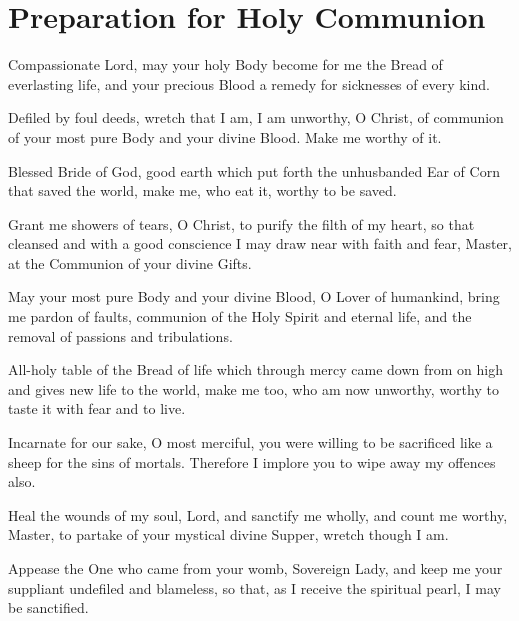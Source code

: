 \newpage
\section{Preparation for Holy Communion}




Compassionate Lord, may your holy Body become for me the Bread of everlasting life, and your precious Blood a remedy for sicknesses of every kind.

Defiled by foul deeds, wretch that I am, I am unworthy, O Christ, of communion of your most pure Body and your divine Blood. Make me worthy of it.

\theotokion

Blessed Bride of God, good earth which put forth the unhusbanded Ear of Corn that saved the world, make me, who eat it, worthy to be saved.


Grant me showers of tears, O Christ, to purify the filth of my heart, so that cleansed and with a good conscience I may draw near with faith and fear, Master, at the Communion of your divine Gifts.

May your most pure Body and your divine Blood, O Lover of humankind, bring me pardon of faults, communion of the Holy Spirit and eternal life, and the removal of passions and tribulations.

\theotokion

All-holy table of the Bread of life which through mercy came down from on high and gives new life to the world, make me too, who am now unworthy, worthy to taste it with fear and to live.


Incarnate for our sake, O most merciful, you were willing to be sacrificed like a sheep for the sins of mortals. Therefore I implore you to wipe away my offences also.

Heal the wounds of my soul, Lord, and sanctify me wholly, and count me worthy, Master, to partake of your mystical divine Supper, wretch though I am.

\theotokion

Appease the One who came from your womb, Sovereign Lady, and keep me your suppliant undefiled and blameless, so that, as I receive the spiritual pearl, I may be sanctified.

